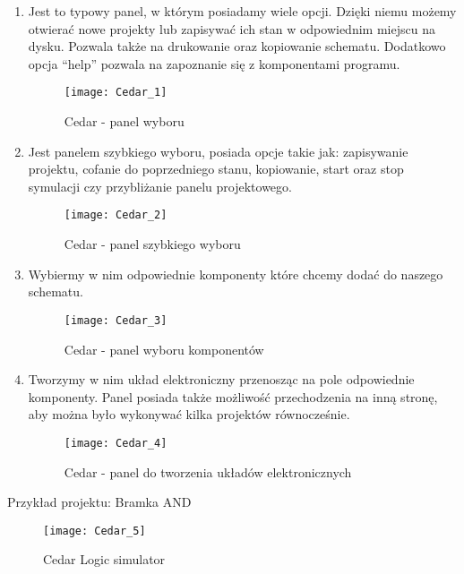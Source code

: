 \documentclass[12pt, a4paper, onside, polish]{article}				%
\begin{document}
 \begin{enumerate}
\item  Jest to typowy panel, w którym posiadamy wiele opcji. Dzięki niemu możemy otwierać nowe projekty lub zapisywać ich stan w odpowiednim miejscu na dysku. Pozwala także na drukowanie oraz kopiowanie schematu. Dodatkowo opcja “help” pozwala na zapoznanie się z komponentami programu. 
  	\begin{figure}[H]
  	  {\centering \texttt{[image: Cedar\_1]} \caption{Cedar - panel wyboru}}\vspace{5mm}
  	  \end{figure}
  	  
\item  Jest panelem szybkiego wyboru, posiada opcje takie jak: zapisywanie projektu, cofanie do poprzedniego stanu, kopiowanie, start oraz stop symulacji czy przybliżanie panelu projektowego.
  	\begin{figure}[H]
  	  {\centering \texttt{[image: Cedar\_2]} \caption{Cedar - panel szybkiego wyboru}}\vspace{5mm}
  	  \end{figure}
  	  
  	  \item  Wybiermy w nim odpowiednie komponenty które chcemy dodać do naszego schematu. 
  	\begin{figure}[H]
  	  {\centering \texttt{[image: Cedar\_3]} \caption{Cedar - panel wyboru komponentów}}\vspace{5mm}
  	  \end{figure}
  	  
  	  
  	  \item  Tworzymy w nim układ elektroniczny przenosząc na pole odpowiednie komponenty. Panel posiada także możliwość przechodzenia na inną stronę, aby można było wykonywać kilka projektów równocześnie. 
  	\begin{figure}[H]
  	  {\centering \texttt{[image: Cedar\_4]} \caption{Cedar - panel do tworzenia układów elektronicznych}}\vspace{5mm}
  	  \end{figure}
\end{enumerate}
Przykład projektu: Bramka AND
\begin{figure}[H]
{\centering \texttt{[image: Cedar\_5]} \caption{Cedar Logic simulator}}\vspace{5mm}
\end{figure}
\end{document}
